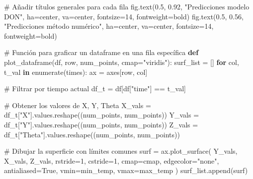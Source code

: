 \documentclass[
  spanish,
  us-letterpaper,
  DIV=11,
  numbers=noendperiod]{scrreprt}
\newenvironment{Shaded}{\begin{snugshade}}{\end{snugshade}}
\newcommand{\BuiltInTok}[1]{\textcolor[rgb]{0.00,0.23,0.31}{#1}}
\newcommand{\CommentTok}[1]{\textcolor[rgb]{0.37,0.37,0.37}{#1}}
\newcommand{\ControlFlowTok}[1]{\textcolor[rgb]{0.00,0.23,0.31}{\textbf{#1}}}
\newcommand{\DecValTok}[1]{\textcolor[rgb]{0.68,0.00,0.00}{#1}}
\newcommand{\FloatTok}[1]{\textcolor[rgb]{0.68,0.00,0.00}{#1}}
\newcommand{\KeywordTok}[1]{\textcolor[rgb]{0.00,0.23,0.31}{\textbf{#1}}}
\newcommand{\NormalTok}[1]{\textcolor[rgb]{0.00,0.23,0.31}{#1}}
\newcommand{\OperatorTok}[1]{\textcolor[rgb]{0.37,0.37,0.37}{#1}}
\newcommand{\StringTok}[1]{\textcolor[rgb]{0.13,0.47,0.30}{#1}}
\newcommand{\VariableTok}[1]{\textcolor[rgb]{0.07,0.07,0.07}{#1}}
\theoremstyle{definition}
\theoremstyle{plain}
\theoremstyle{remark}
\begin{document}
\begin{Shaded}
\begin{Highlighting}[]
\CommentTok{\# Añadir títulos generales para cada fila}
\NormalTok{fig.text(}\FloatTok{0.5}\NormalTok{, }\FloatTok{0.92}\NormalTok{, }\StringTok{"Predicciones modelo DON"}\NormalTok{, ha}\OperatorTok{=}\StringTok{\textquotesingle{}center\textquotesingle{}}\NormalTok{, va}\OperatorTok{=}\StringTok{\textquotesingle{}center\textquotesingle{}}\NormalTok{, fontsize}\OperatorTok{=}\DecValTok{14}\NormalTok{, fontweight}\OperatorTok{=}\StringTok{\textquotesingle{}bold\textquotesingle{}}\NormalTok{)}
\NormalTok{fig.text(}\FloatTok{0.5}\NormalTok{, }\FloatTok{0.56}\NormalTok{, }\StringTok{"Predicciones método numérico"}\NormalTok{, ha}\OperatorTok{=}\StringTok{\textquotesingle{}center\textquotesingle{}}\NormalTok{, va}\OperatorTok{=}\StringTok{\textquotesingle{}center\textquotesingle{}}\NormalTok{, fontsize}\OperatorTok{=}\DecValTok{14}\NormalTok{, fontweight}\OperatorTok{=}\StringTok{\textquotesingle{}bold\textquotesingle{}}\NormalTok{)}

\CommentTok{\# Función para graficar un dataframe en una fila específica}
\KeywordTok{def}\NormalTok{ plot\_dataframe(df, row, num\_points, cmap}\OperatorTok{=}\StringTok{"viridis"}\NormalTok{):}
\NormalTok{    surf\_list }\OperatorTok{=}\NormalTok{ []}
    \ControlFlowTok{for}\NormalTok{ col, t\_val }\KeywordTok{in} \BuiltInTok{enumerate}\NormalTok{(times):}
\NormalTok{        ax }\OperatorTok{=}\NormalTok{ axes[row, col]}
        
        \CommentTok{\# Filtrar por tiempo actual}
\NormalTok{        df\_t }\OperatorTok{=}\NormalTok{ df[df[}\StringTok{"time"}\NormalTok{] }\OperatorTok{==}\NormalTok{ t\_val]}

        \CommentTok{\# Obtener los valores de X, Y, Theta}
\NormalTok{        X\_vals }\OperatorTok{=}\NormalTok{ df\_t[}\StringTok{"X"}\NormalTok{].values.reshape((num\_points, num\_points))}
\NormalTok{        Y\_vals }\OperatorTok{=}\NormalTok{ df\_t[}\StringTok{"Y"}\NormalTok{].values.reshape((num\_points, num\_points))}
\NormalTok{        Z\_vals }\OperatorTok{=}\NormalTok{ df\_t[}\StringTok{"Theta"}\NormalTok{].values.reshape((num\_points, num\_points))}

        \CommentTok{\# Dibujar la superficie con límites comunes}
\NormalTok{        surf }\OperatorTok{=}\NormalTok{ ax.plot\_surface(}
\NormalTok{            Y\_vals, X\_vals, Z\_vals,}
\NormalTok{            rstride}\OperatorTok{=}\DecValTok{1}\NormalTok{, cstride}\OperatorTok{=}\DecValTok{1}\NormalTok{,}
\NormalTok{            cmap}\OperatorTok{=}\NormalTok{cmap,}
\NormalTok{            edgecolor}\OperatorTok{=}\StringTok{"none"}\NormalTok{,}
\NormalTok{            antialiased}\OperatorTok{=}\VariableTok{True}\NormalTok{,}
\NormalTok{            vmin}\OperatorTok{=}\NormalTok{min\_temp,}
\NormalTok{            vmax}\OperatorTok{=}\NormalTok{max\_temp}
\NormalTok{        )}
\NormalTok{        surf\_list.append(surf)}


\end{Highlighting}
\end{Shaded}
\end{document}
